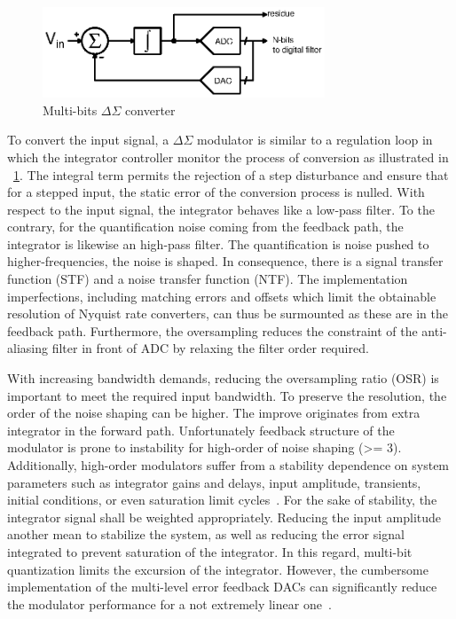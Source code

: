 \begin{figure}[htp]
    \centering
    \includegraphics[width=0.75\textwidth]{Chapter2/Figs/Vector/sigma-delta.ps}
    \caption{Multi-bits $\Delta\Sigma$ converter}
    \label{fig:multi-bit}
\end{figure}

To convert the input signal, a $\Delta\Sigma$ modulator is similar to a regulation loop in which the integrator controller monitor the process of conversion as illustrated in \figurename~\ref{fig:multi-bit}. The integral term permits the rejection of a step disturbance and ensure that for a stepped input, the static error of the conversion process is nulled. With respect to the input signal, the integrator behaves like a low-pass filter. To the contrary, for the quantification noise coming from the feedback path, the integrator is likewise an high-pass filter. The quantification is noise pushed to higher-frequencies, the noise is shaped. In consequence, there is a signal transfer function (STF) and a noise transfer function (NTF). The implementation imperfections, including matching errors and offsets which limit the obtainable resolution of Nyquist rate converters, can thus be surmounted as these are in the feedback path. Furthermore, the oversampling reduces the constraint of the anti-aliasing filter in front of ADC by relaxing the filter order required.

With increasing bandwidth demands, reducing the oversampling ratio (OSR) is important to meet the required input bandwidth. To preserve the resolution, the order of the noise shaping can be higher. The improve originates from extra integrator in the forward path. Unfortunately feedback structure of the modulator is prone to instability for high-order of noise shaping (>= 3). Additionally, high-order modulators suffer from a stability dependence on system parameters such as integrator gains and delays, input amplitude, transients, initial conditions, or even saturation limit cycles~\cite{Hein1993,Baird1994,Steven1996}. For the sake of stability, the integrator signal shall be weighted appropriately. Reducing the input amplitude another mean to stabilize the system, as well as reducing the error signal integrated to prevent saturation of the integrator. In this regard, multi-bit quantization limits the excursion of the integrator. However, the cumbersome implementation of the multi-level error feedback DACs can significantly reduce the modulator performance for a not extremely linear one~\cite{Medeiro1999}.

